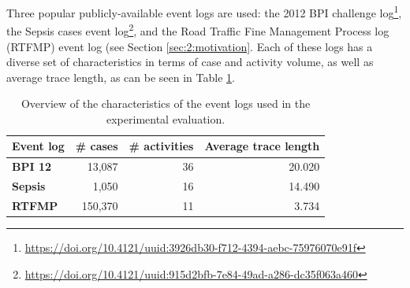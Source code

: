 Three popular publicly-available event logs are used: the 2012 BPI challenge log\footnote{\url{https://doi.org/10.4121/uuid:3926db30-f712-4394-aebc-75976070e91f}}, the Sepsis cases event log\footnote{\url{https://doi.org/10.4121/uuid:915d2bfb-7e84-49ad-a286-dc35f063a460}}, and the Road Traffic Fine Management Process log (RTFMP) event log (see Section \ref{sec:2:motivation}.
Each of these logs has a diverse set of characteristics in terms of case and activity volume, as well as average trace length, as can be seen in Table \ref{tab:eventlogs}.
\begin{table}[htbp]
  \centering
    \begin{tabular}{lrrr}
    \toprule
    \textbf{Event log} & \multicolumn{1}{l}{\textbf{\# cases}} & \multicolumn{1}{l}{\textbf{\# activities}} & \multicolumn{1}{l}{\textbf{Average trace length}} \\
    \midrule
    \textbf{BPI 12} & 13,087 & 36    & 20.020 \\
    \textbf{Sepsis} & 1,050 & 16    & 14.490 \\
    \textbf{RTFMP} & 150,370 & 11    & 3.734 \\
    \bottomrule
    \end{tabular}%
  \caption{Overview of the characteristics of the event logs used in the experimental evaluation.}
  \label{tab:eventlogs}%
\end{table}%

